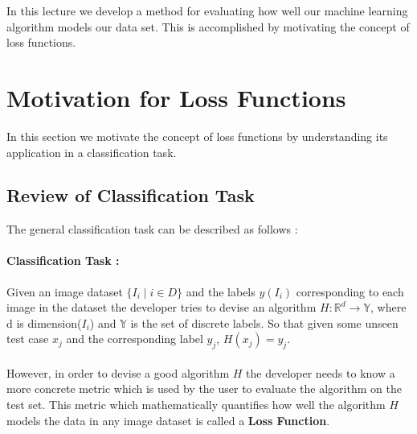 \documentclass[12pt]{article}
\begin{document}
	\MakeScribeTop


In this lecture we develop a method for evaluating how well our machine learning algorithm models our data set. This is accomplished by motivating the concept of loss functions.

\section{Motivation for Loss Functions}
In this section we motivate the concept of loss functions by understanding its application in a classification task.
\subsection{Review of Classification Task}
The general classification task can be described as follows :
\paragraph{Classification Task :}Given an image dataset $\{I_i\; \vert \; i \in D\}$ and the labels $y(I_i)$ corresponding to each image in the dataset the developer tries to devise an algorithm $H : \mathbb{R}^d \rightarrow \mathbb{Y}$, where d is dimension($I_i$) and $\mathbb{Y}$ is the set of discrete labels. So that given some unseen test case $x_j$ and the corresponding label $y_j$, $H(x_j) = y_j$.\\
\\
However, in order to devise a good algorithm $H$ the developer needs to know a more concrete metric which is used by the user to evaluate the algorithm on the test set. This metric which mathematically quantifies how well the algorithm $H$ models the data in any image dataset is called a \textbf{Loss Function}.
\end{document}
